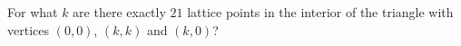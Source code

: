 For what $k$ are there exactly $21$ lattice points in the interior of the triangle with vertices $(0,0)$, $(k,k)$ and $(k,0)$?
